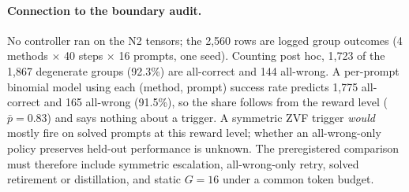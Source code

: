 \paragraph{Connection to the boundary audit.}
No controller ran on the N2 tensors; the 2,560 rows are logged group outcomes
(4 methods $\times$ 40 steps $\times$ 16 prompts, one seed). Counting
post hoc, 1,723 of the 1,867 degenerate groups (92.3\%) are all-correct and
144 all-wrong. A per-prompt binomial model using each (method, prompt)
success rate predicts 1,775 all-correct and 165 all-wrong (91.5\%), so the
share follows from the reward level ($\bar p=0.83$) and says nothing about a
trigger. A symmetric ZVF trigger \emph{would} mostly fire on solved prompts
at this reward level; whether an all-wrong-only policy preserves held-out
performance is unknown. The preregistered comparison must
therefore include symmetric escalation, all-wrong-only retry, solved retirement
or distillation, and static $G=16$ under a common token budget.
